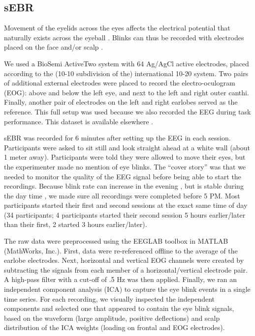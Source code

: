 \documentclass[11pt,]{memoir}
\begin{document}
\hypertarget{AB_sEBR-sEBR}{%
\subsection{sEBR}\label{AB_sEBR-sEBR}}

Movement of the eyelids across the eyes affects the electrical potential that naturally exists across the eyeball \autocite{Matsuo1975}. Blinks can thus be recorded with electrodes placed on the face and/or scalp \autocite{Luck2005}.

We used a BioSemi ActiveTwo system with 64 Ag/AgCl active electrodes, placed according to the (10-10 subdivision of the) international 10-20 system. Two pairs of additional external electrodes were placed to record the electro-oculogram (EOG): above and below the left eye, and next to the left and right outer canthi. Finally, another pair of electrodes on the left and right earlobes served as the reference. This full setup was used because we also recorded the EEG during task performance. This dataset is available elsewhere \autocite{Reteig2019_data}.

sEBR was recorded for 6 minutes after setting up the EEG in each session. Participants were asked to sit still and look straight ahead at a white wall (about 1 meter away). Participants were told they were allowed to move their eyes, but the experimenter made no mention of eye blinks. The ``cover story'' was that we needed to monitor the quality of the EEG signal before being able to start the recordings. Because blink rate can increase in the evening \autocite{Barbato2000}, but is stable during the day time \autocites{Barbato2000}{Doughty2006}, we made sure all recordings were completed before 5 PM. Most participants started their first and second sessions at the exact same time of day (34 participants; 4 participants started their second session 5 hours earlier/later than their first, 2 started 3 hours earlier/later).

The raw data were preprocessed using the EEGLAB toolbox \autocite{Delorme2004} in MATLAB (MathWorks, Inc.). First, data were re-referenced offline to the average of the earlobe electrodes. Next, horizontal and vertical EOG channels were created by subtracting the signals from each member of a horizontal/vertical electrode pair. A high-pass filter with a cut-off of .5 Hz was then applied. Finally, we ran an independent component analysis (ICA) to capture the eye blink events in a single time series. For each recording, we visually inspected the independent components and selected one that appeared to contain the eye blink signals, based on the waveform (large amplitude, positive deflections) and scalp distribution of the ICA weights (loading on frontal and EOG electrodes).
\end{document}
